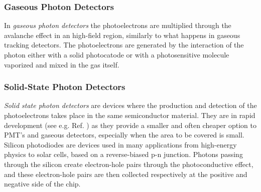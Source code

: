 \subsubsection*{Gaseous Photon Detectors}
In \textit{gaseous photon detectors} the photoelectrons are multiplied through the avalanche effect in an high-field region, similarly to what happens in gaseous tracking detectors. The photoelectrons are generated by the interaction of the photon either with a solid photocatode or with a photosensitive molecule vaporized and mixed in the gas itself. 

\subsubsection*{Solid-State Photon Detectors}
\textit{Solid state photon detectors} are devices where the production and detection of the photoelectrons takes place in the same semiconductor material. They are in rapid development (see e.g. Ref. \cite{Renker:2009zz}) as they provide a smaller and often cheaper option to PMT's and gaseous detectors, especially when the area to be covered is small. Silicon photodiodes are devices used in many applications from high-energy physics to solar cells, based on a reverse-biased p-n junction. Photons passing through the silicon create electron-hole pairs through the photoconductive effect, and these electron-hole pairs are then collected respectively at the positive and negative side of the chip. 




